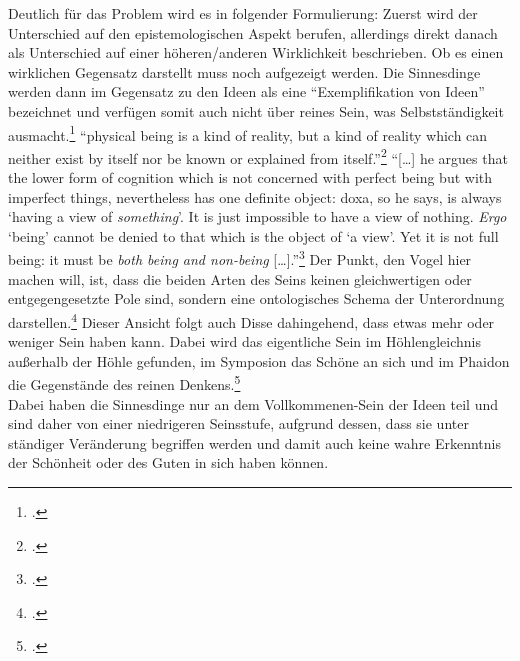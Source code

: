 Deutlich für das Problem wird es in folgender Formulierung:  Zuerst wird der Unterschied auf den epistemologischen Aspekt berufen, allerdings direkt danach als Unterschied auf einer höheren/anderen Wirklichkeit beschrieben. Ob es einen wirklichen Gegensatz darstellt muss noch aufgezeigt werden.
Die Sinnesdinge werden dann im Gegensatz zu den Ideen als eine \enquote{Exemplifikation von Ideen} bezeichnet und verfügen somit auch nicht über reines Sein, was Selbstständigkeit ausmacht.\footcite[vgl.][S. 146]{GraeserPhiloGeschichte}
\enquote{physical being is a kind of reality, but a kind of reality which can neither exist by itself nor be known or explained from itself.}\footcite[][S. 162]{Vogel}
\enquote{[\dots] he argues that the lower form of cognition which is not concerned with perfect being but with imperfect things, nevertheless has one definite object: doxa, so he says, is always \enquote{having a view of \emph{something}}. It is just impossible to have a view of nothing. \emph{Ergo} \enquote{being} cannot be denied to that which is the object of \enquote{a view}. Yet it is not full being: it must be \emph{both being and non-being} [\dots].}\footcite[vgl.][S. 165]{Vogel}
Der Punkt, den Vogel hier machen will, ist, dass die beiden Arten des Seins keinen gleichwertigen oder entgegengesetzte Pole sind, sondern eine ontologisches Schema der Unterordnung darstellen.\footcite[vgl.][S. 165]{Vogel}
Dieser Ansicht folgt auch Disse dahingehend, dass etwas mehr oder weniger Sein haben kann. Dabei wird das eigentliche Sein im Höhlengleichnis außerhalb der Höhle gefunden, im Symposion das Schöne an sich und im Phaidon die Gegenstände des reinen Denkens.\footcite[vgl.][S. 37]{DisseMetaphysik}\\ Dabei haben die Sinnesdinge nur an dem Vollkommenen-Sein der Ideen teil und sind daher von einer niedrigeren Seinsstufe, aufgrund dessen, dass sie unter ständiger Veränderung begriffen werden und damit auch keine wahre Erkenntnis der Schönheit oder des Guten in sich haben können.
